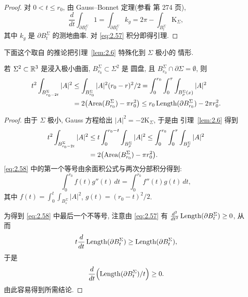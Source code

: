 \begin{proof}
对 $0<t\leq r_0$, 由 Gauss--Bonnet 定理(参看 \cite{dC1} 第 274 页),
\begin{equation}
\frac{d}{dt}\int_{\partial B_t^{\Sigma}}1
 =\int_{\partial B_t^{\Sigma}}k_g
 =2\pi-\int_{B_t^{\Sigma}}\mathrm{K}_{\Sigma},
\label{eq:2.57}
\end{equation}
其中 $k_g$ 是 $\partial B_t^{\Sigma}$ 的测地曲率. 对 \eqref{eq:2.57} 积分即得引理.
\end{proof}

下面这个取自 \cite{CM4} 的推论把引理~\ref{lem:2.6} 特殊化到 $\Sigma$ 极小的
情形.

\begin{corollary}
\label{cor:2.7}
若 $\Sigma^2\subset\mathbb{R}^3$ 是浸入极小曲面, $B_{r_0}^{\Sigma}\subset\Sigma^2$ 是
圆盘, 且 $B_{r_0}^{\Sigma}\cap\partial\Sigma=\emptyset$, 则
\begin{equation}
\begin{aligned}
t^{2}\int_{B_{r_0-2t}^{\Sigma}}|A|^{2}
&\leq\int_{B_{r_0}^{\Sigma}}|A|^{2}(r_0-r)^{2}/2
 =\int_0^{r_0}\int_0^{\tau}\int_{B_\rho^{\Sigma}(x)}|A|^{2}\\
&=2\bigl(\operatorname{Area}(B_{r_0}^{\Sigma})-\pi r_0^{2}\bigr)
 \leq r_0\operatorname{Length}(\partial B_{r_0}^{\Sigma})-2\pi r_0^{2}.
\end{aligned}
\label{eq:2.58}
\end{equation}
\end{corollary}

\begin{proof}
由于 $\Sigma$ 极小, Gauss 方程给出 $|A|^{2}=-2\mathrm{K}_{\Sigma}$, 于是由
引理~\ref{lem:2.6} 得到
\begin{equation}
\begin{aligned}
t^{2}\int_{B_{r_0-2t}^{\Sigma}}|A|^{2}
&\leq t\int_0^{r_0-t}\int_{B_\rho^{\Sigma}}|A|^{2}
 \leq\int_0^{r_0}\int_0^{\tau}\int_{B_\rho^{\Sigma}}|A|^{2}\\
&=2\bigl(\operatorname{Area}(B_{r_0}^{\Sigma})-\pi r_0^{2}\bigr).
\end{aligned}
\label{eq:2.59}
\end{equation}
\eqref{eq:2.58} 中的第一个等号由余面积公式与两次分部积分得到:
\begin{equation}
\int_0^{r_0}f(t)g''(t)\,dt=\int_0^{r_0}f''(t)g(t)\,dt,
\label{eq:2.60}
\end{equation}
其中 $f(t)=\int_0^t\int_{B_s^{\Sigma}}|A|^{2}$, $g(t)=(r_0-t)^{2}/2$.

为得到 \eqref{eq:2.58} 中最后一个不等号, 注意由 \eqref{eq:2.57} 有
$\frac{d^{2}}{dt^{2}}\operatorname{Length}(\partial B_t^{\Sigma})\geq0$, 从而
\[
t\frac{d}{dt}\operatorname{Length}(\partial B_t^{\Sigma})\geq\operatorname{Length}(\partial B_t^{\Sigma}),
\]
于是
\[
\frac{d}{dt}\Bigl(\operatorname{Length}(\partial B_t^{\Sigma})/t\Bigr)\geq0.
\]
由此容易得到所需结论.
\end{proof}


